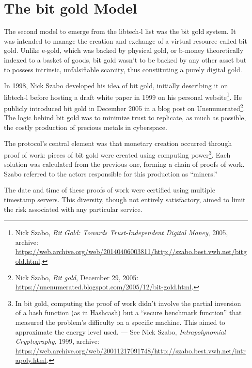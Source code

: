 \documentclass[
  a5paper,
  smalldemyvopaper,10pt,twoside,onecolumn,openright,extrafontsizes,hidelinks]{memoir}
\begin{document}
\section*{The bit gold Model}\label{the-bit-gold-model}


The second model to emerge from the libtech-l list was the bit gold
system. It was intended to manage the creation and exchange of a virtual
resource called bit gold. Unlike e-gold, which was backed by physical
gold, or b-money theoretically indexed to a basket of goods, bit gold
wasn't to be backed by any other asset but to possess intrinsic,
unfalsifiable scarcity, thus constituting a purely digital gold.

In 1998, Nick Szabo developed his idea of bit gold, initially describing
it on libtech-l before hosting a draft white paper in 1999 on his
personal website\footnote{Nick Szabo, \emph{Bit Gold: Towards
  Trust-Independent Digital Money}, 2005, archive:
  \url{https://web.archive.org/web/20140406003811/http://szabo.best.vwh.net/bitgold.html}.}.
He publicly introduced bit gold in December 2005 in a blog post on
Unenumerated\footnote{Nick Szabo, \emph{Bit gold}, December 29, 2005:
  \url{https://unenumerated.blogspot.com/2005/12/bit-gold.html}.}. The
logic behind bit gold was to minimize trust to replicate, as much as
possible, the costly production of precious metals in cyberspace.

The protocol's central element was that monetary creation occurred
through proof of work: pieces of bit gold were created using computing
power\footnote{In bit gold, computing the proof of work didn't involve
  the partial inversion of a hash function (as in Hashcash) but a
  ``secure benchmark function'' that measured the problem's difficulty
  on a specific machine. This aimed to approximate the energy level
  used. --- See Nick Szabo, \emph{Intrapolynomial Cryptography}, 1999,
  archive:
  \url{https://web.archive.org/web/20011217091748/http://szabo.best.vwh.net/intrapoly.html}.}.
Each solution was calculated from the previous one, forming a chain of
proofs of work. Szabo referred to the actors responsible for this
production as ``miners.''

The date and time of these proofs of work were certified using multiple
timestamp servers. This diversity, though not entirely satisfactory,
aimed to limit the risk associated with any particular service.
\end{document}
